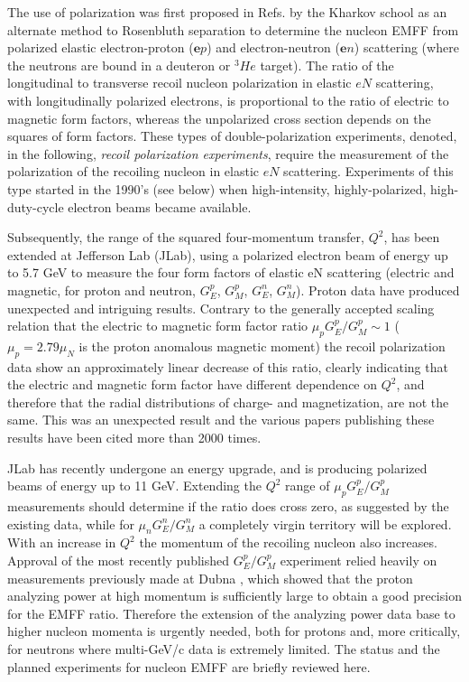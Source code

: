\documentclass[twocolumn,epjc3]{svjour3}
\renewcommand{\vec}[1]{\boldsymbol{#1}} %
\begin{document}
The use of polarization was first proposed in Refs. \cite{Akhiezer:1968ek,Akhiezer:1974em} by the Kharkov school as an alternate method to Rosenbluth separation to determine the nucleon EMFF from polarized elastic electron-proton ($\vec e p$) and electron-neutron ($ \vec e n$) scattering (where the neutrons are bound in a deuteron or $^3\!He$ target). The ratio of the longitudinal to transverse recoil nucleon polarization in elastic $eN$ scattering, with longitudinally polarized electrons, is proportional to the ratio of electric to magnetic form factors, whereas the unpolarized cross section depends on the squares of form factors. These types of double-polarization experiments, denoted, in the following, {\it recoil polarization experiments}, require the measurement of the polarization of the recoiling nucleon in elastic $eN$ scattering. Experiments of this type started in the 1990's (see below) when high-intensity, highly-polarized, high-duty-cycle electron beams became available.

Subsequently, the range of the squared four-momentum transfer, $Q^2$, has been extended at Jefferson Lab (JLab), using a polarized electron beam of energy up to 5.7 GeV to measure the four form factors of elastic eN scattering (electric and magnetic, for proton and neutron, $G^p_E$, $G^p_M$, $G^n_E$, $G^n_M$). Proton data have produced unexpected and intriguing results.  Contrary to the generally accepted scaling relation that the electric to magnetic form factor ratio $\mu_p G^p_E/G^p_M \sim 1$ ($\mu_p=2.79\!\mu_N$ is the proton anomalous magnetic moment) the recoil polarization data show an approximately linear decrease of this ratio, clearly indicating that the electric and magnetic form factor have different dependence on $Q^2$, and therefore that the radial distributions of charge- and magnetization, are not the same.  This was an unexpected result and the various papers publishing these results \cite{Jones:1999rz,Punjabi:2005wq,Gayou:2001qd,Puckett:2011xg,Puckett:2010ac,Puckett:2017flj,Meziane:2010xc} have been cited more than 2000 times.

JLab has recently undergone an energy upgrade, and is producing polarized beams of energy up to 11 GeV. Extending the $Q^2$ range of $\mu_p G^p_{E}/G^p_{M}$ measurements should determine if the ratio does cross zero, as suggested by the existing data, while for $\mu_n G^n_{E}/G^n_{M}$ a completely virgin territory will be explored. With an increase in $Q^2$ the momentum of the recoiling nucleon also increases. Approval of the most recently published $G^p_E/G^p_M$ experiment \cite{Puckett:2017flj} relied heavily on measurements previously made at Dubna \cite{Azhgirey:2004yk}, which showed that the proton analyzing power at high momentum is sufficiently large to obtain a good precision for the EMFF ratio. Therefore the extension of the analyzing power data base to higher nucleon momenta is urgently needed, both for protons and, more critically, for neutrons where multi-GeV/c data is extremely limited. The status and the planned experiments for nucleon EMFF are briefly reviewed here.
\end{document}
